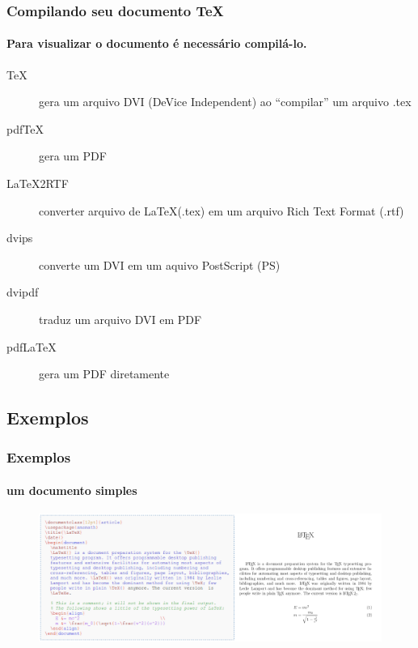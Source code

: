 \begin{frame}
\frametitle{Compilando seu documento \TeX{}}
\framesubtitle{Para visualizar o documento é necessário compilá-lo.}
   \begin{description}
   \item[\TeX] gera um arquivo DVI (DeVice Independent) ao ``compilar'' um arquivo .tex
   \item[pdfTeX] gera um PDF
   \item[LaTeX2RTF] converter arquivo de \LaTeX (.tex) em um arquivo  Rich Text Format (.rtf)
   \item[dvips] converte um DVI em um aquivo PostScript (PS)
   \item[dvipdf] traduz um arquivo DVI em PDF
   \item[pdfLaTeX] gera um PDF diretamente
   \end{description}
\end{frame}

\subsection{Exemplos}
\begin{frame}
\frametitle{Exemplos}
\framesubtitle{um documento simples}
  \begin{figure}[h!]
  \centering
  \includegraphics[width=\textwidth]{figures/exdoc.png}
  \label{fig:exdoc}
  \end{figure}
\end{frame}

 
 
